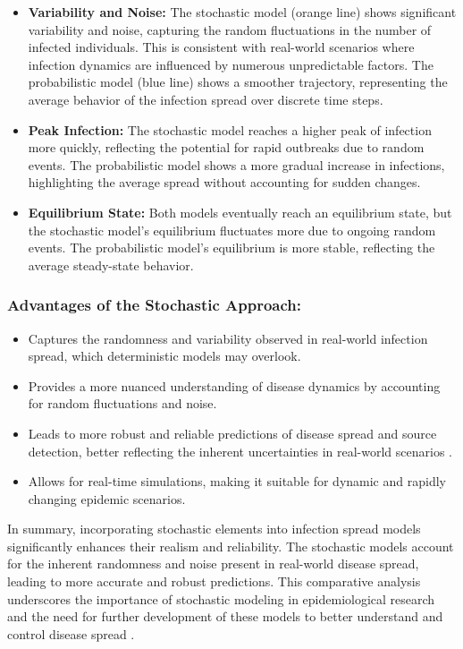 \begin{itemize}
    \item \textbf{Variability and Noise:} The stochastic model (orange line) shows significant variability and noise, capturing the random fluctuations in the number of infected individuals. This is consistent with real-world scenarios where infection dynamics are influenced by numerous unpredictable factors. The probabilistic model (blue line) shows a smoother trajectory, representing the average behavior of the infection spread over discrete time steps.
    
    \item \textbf{Peak Infection:} The stochastic model reaches a higher peak of infection more quickly, reflecting the potential for rapid outbreaks due to random events. The probabilistic model shows a more gradual increase in infections, highlighting the average spread without accounting for sudden changes.
    
    \item \textbf{Equilibrium State:} Both models eventually reach an equilibrium state, but the stochastic model's equilibrium fluctuates more due to ongoing random events. The probabilistic model's equilibrium is more stable, reflecting the average steady-state behavior.
\end{itemize}

\subsubsection{Advantages of the Stochastic Approach:}

\begin{itemize}
\item Captures the randomness and variability observed in real-world infection spread, which deterministic models may overlook.
\item Provides a more nuanced understanding of disease dynamics by accounting for random fluctuations and noise.
\item Leads to more robust and reliable predictions of disease spread and source detection, better reflecting the inherent uncertainties in real-world scenarios \cite{hethcote2000}.
\item Allows for real-time simulations, making it suitable for dynamic and rapidly changing epidemic scenarios.
\end{itemize}

In summary, incorporating stochastic elements into infection spread models significantly enhances their realism and reliability. The stochastic models account for the inherent randomness and noise present in real-world disease spread, leading to more accurate and robust predictions. This comparative analysis underscores the importance of stochastic modeling in epidemiological research and the need for further development of these models to better understand and control disease spread \cite{ross2011}.

